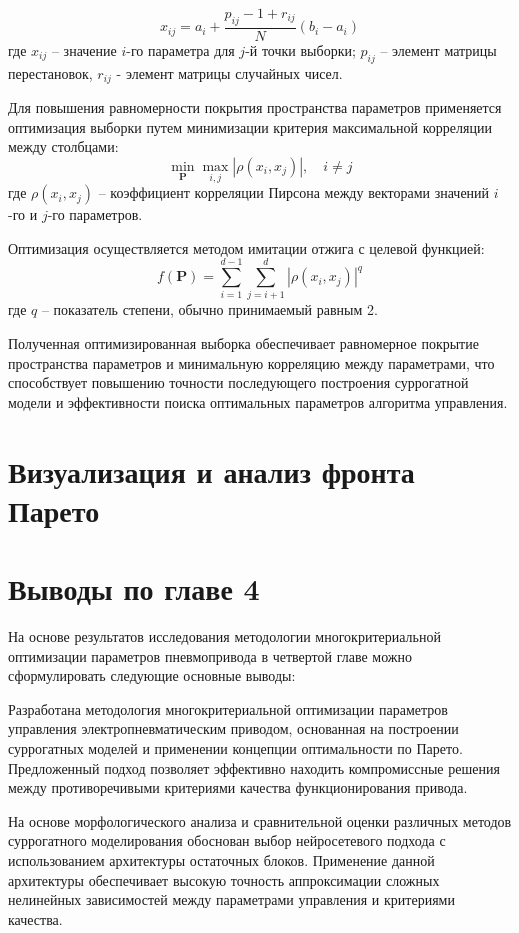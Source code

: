\begin{equation*}
x_{ij} = a_i + \frac{p_{ij} - 1 + r_{ij}}{N}(b_i - a_i)
\end{equation*}
где $x_{ij}$ -- значение $i$-го параметра для $j$-й точки выборки;
$p_{ij}$ -- элемент матрицы перестановок, $r_{ij}$ - элемент матрицы случайных чисел.

Для повышения равномерности покрытия пространства параметров применяется
оптимизация выборки путем минимизации критерия максимальной корреляции между столбцами:
\begin{equation*}
\min_{\mathbf{P}} \max_{i,j} |\rho(x_i, x_j)|, \quad i \neq j
\end{equation*}
где $\rho(x_i, x_j)$ -- коэффициент корреляции Пирсона между векторами значений $i$-го и $j$-го параметров.

Оптимизация осуществляется методом имитации отжига с целевой функцией:
\begin{equation*}
f(\mathbf{P}) = \sum_{i=1}^{d-1}\sum_{j=i+1}^d |\rho(x_i, x_j)|^q
\end{equation*}
где $q$ -- показатель степени, обычно принимаемый равным 2.

Полученная оптимизированная выборка обеспечивает равномерное покрытие пространства
параметров и минимальную корреляцию между параметрами, что способствует повышению
точности последующего построения суррогатной модели и эффективности поиска оптимальных параметров алгоритма управления.

\section{Визуализация и анализ фронта Парето}\label{sec:ch4/sec6}
\section{Выводы по главе 4}\label{sec:ch4/sec7}
На основе результатов исследования методологии многокритериальной оптимизации
параметров пневмопривода в четвертой главе можно сформулировать следующие основные выводы:

Разработана методология многокритериальной оптимизации параметров управления электропневматическим приводом,
основанная на построении суррогатных моделей и применении концепции оптимальности по Парето. Предложенный подход
позволяет эффективно находить компромиссные решения между противоречивыми критериями качества функционирования привода.

На основе морфологического анализа и сравнительной оценки различных методов суррогатного моделирования обоснован
выбор нейросетевого подхода с использованием архитектуры остаточных блоков. Применение данной архитектуры обеспечивает
высокую точность аппроксимации сложных нелинейных зависимостей между параметрами управления и критериями качества.

